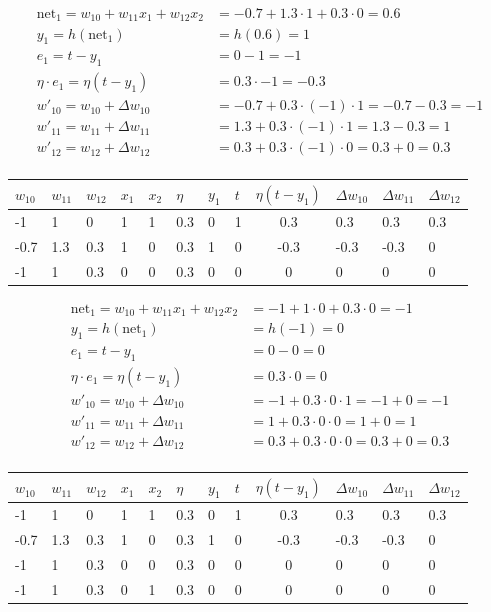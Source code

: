 \documentclass[11pt]{article}
\begin{document}
\begin{align*}
    \text{net}_1 = w_{10} + w_{11}x_1 + w_{12}x_2 &= -0.7 + 1.3 \cdot 1 + 0.3 \cdot 0 = 0.6\\
    y_1 = h(\text{net}_1) &= h(0.6) = 1\\
    e_1 = t - y_1 &= 0 - 1 = -1\\
    \eta \cdot e_1 = \eta (t - y_1) &= 0.3\cdot -1 = -0.3\\
    w'_{10} = w_{10} + \Delta w_{10} &= -0.7 + 0.3\cdot (-1)\cdot 1 = -0.7 - 0.3 = -1\\
    w'_{11} = w_{11} + \Delta w_{11} &= 1.3 + 0.3\cdot (-1)\cdot 1 = 1.3 - 0.3 = 1 \\
    w'_{12} = w_{12} + \Delta w_{12} &= 0.3 + 0.3\cdot (-1)\cdot 0 = 0.3 + 0 = 0.3 \\
\end{align*}

\begin{tabularx}{\linewidth}{XXXXXXXXcXXX}
    \hline
    $w_{10}$ & $w_{11}$ & $w_{12}$ & $x_1$ & $x_2$ & $\eta$ & $y_1$ & $t$ & $\eta (t-y_1)$ & $\Delta w_{10}$ & $\Delta w_{11}$ & $\Delta w_{12}$\\
    \hline
    -1 & 1 & 0 & 1 & 1 & 0.3 & 0 & 1 & 0.3 & 0.3 & 0.3 & 0.3\\
    \hline
    -0.7 & 1.3 & 0.3 & 1 & 0 & 0.3 & 1 & 0 & -0.3 & -0.3 & -0.3 & 0\\
    \hline
    -1 & 1 & 0.3 & 0 & 0 & 0.3 & 0 & 0 & 0 & 0 & 0 & 0\\
    \hline
\end{tabularx}

\begin{align*}
    \text{net}_1 = w_{10} + w_{11}x_1 + w_{12}x_2 &= -1 + 1 \cdot 0 + 0.3 \cdot 0 = -1\\
    y_1 = h(\text{net}_1) &= h(-1) = 0\\
    e_1 = t - y_1 &= 0 - 0 = 0\\
    \eta \cdot e_1 = \eta (t - y_1) &= 0.3\cdot 0 = 0\\
    w'_{10} = w_{10} + \Delta w_{10} &= -1 + 0.3\cdot 0 \cdot 1 = -1 + 0 = -1\\
    w'_{11} = w_{11} + \Delta w_{11} &= 1 + 0.3\cdot 0 \cdot 0 = 1 + 0 = 1 \\
    w'_{12} = w_{12} + \Delta w_{12} &= 0.3 + 0.3\cdot 0 \cdot 0 = 0.3 + 0 = 0.3 \\
\end{align*}

\begin{tabularx}{\linewidth}{XXXXXXXXcXXX}
    \hline
    $w_{10}$ & $w_{11}$ & $w_{12}$ & $x_1$ & $x_2$ & $\eta$ & $y_1$ & $t$ & $\eta (t-y_1)$ & $\Delta w_{10}$ & $\Delta w_{11}$ & $\Delta w_{12}$\\
    \hline
    -1 & 1 & 0 & 1 & 1 & 0.3 & 0 & 1 & 0.3 & 0.3 & 0.3 & 0.3\\
    \hline
    -0.7 & 1.3 & 0.3 & 1 & 0 & 0.3 & 1 & 0 & -0.3 & -0.3 & -0.3 & 0\\
    \hline
    -1 & 1 & 0.3 & 0 & 0 & 0.3 & 0 & 0 & 0 & 0 & 0 & 0\\
    \hline
    -1 & 1 & 0.3 & 0 & 1 & 0.3 & 0 & 0 & 0 & 0 & 0 & 0\\
    \hline
\end{tabularx}
\end{document}
